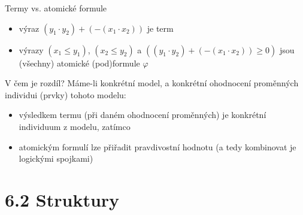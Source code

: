 \documentclass{beamer}
\begin{document}
\begin{frame}{Termy vs. atomické formule}
    
    \pause
    
    \begin{itemize}
        \item výraz \alert{$(y_1 \cdot y_2)+(-(x_1\cdot x_2))$} je \alert{term}\pause
        \item výrazy \alert{$(x_1\leq y_1)$}, \alert{$(x_2\leq y_2)$} a \alert{$((y_1 \cdot y_2)+(-(x_1\cdot x_2))\geq 0)$} jsou (všechny) \alert{atomické (pod)formule} $\varphi$ \pause
    \end{itemize}
   
    V čem je rozdíl? \pause Máme-li konkrétní model, a konkrétní \alert{ohodnocení proměnných} individui (prvky) tohoto modelu: \pause 
    
    \begin{itemize}
        \item výsledkem termu (při daném ohodnocení proměnných) je konkrétní \alert{individuum z modelu}, zatímco\pause
        \item atomickým formulí lze přiřadit \alert{pravdivostní hodnotu} (a tedy kombinovat je logickými spojkami)
    \end{itemize}   

\end{frame}


\section{6.2 Struktury}
\end{document}
